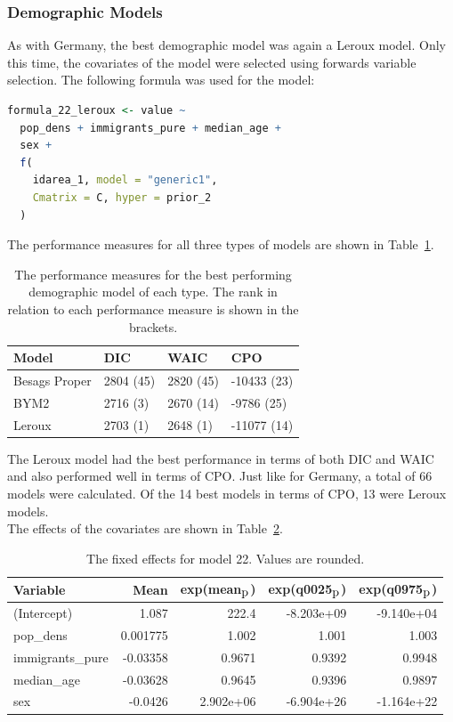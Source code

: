 \subsubsection{Demographic Models}
As with Germany, the best demographic model was again a Leroux model. Only this time, the covariates of the model were selected using forwards variable selection. The following formula was used for the model:
\begin{lstlisting}[caption={The formula for the best Leroux model based on the demographic variables}, label={codeDemoNorway}, language = R]
formula_22_leroux <- value ~
  pop_dens + immigrants_pure + median_age +
  sex +
  f(
    idarea_1, model = "generic1",
    Cmatrix = C, hyper = prior_2
  )
\end{lstlisting}
The performance measures for all three types of models are shown in Table~\ref{demoNorway}.
\begin{table}[H] 
\caption{The performance measures for the best performing demographic model of each type. The rank in relation to each performance measure is shown in the brackets. \label{demoNorway}}
\begin{tabular}{l l l l}
\toprule
\textbf{Model}	& \textbf{DIC}	& \textbf{WAIC} & \textbf{CPO} \\
\midrule
Besags Proper  & 2804 (45) & 2820 (45) & -10433 (23) \\
BYM2 & 2716 (3) & 2670 (14) & -9786 (25)\\
Leroux & 2703 (1) & 2648 (1) & -11077 (14) \\
\bottomrule
\end{tabular}
\end{table}
The Leroux model had the best performance in terms of both DIC and WAIC and also performed well in terms of CPO. Just like for Germany, a total of 66 models were calculated. Of the 14 best models in terms of CPO, 13 were Leroux models. \\
The effects of the covariates are shown in Table~\ref{fixedDemoNorway}.
\begin{table}[H] 
\caption{The fixed effects for model 22. Values are rounded. \label{fixedDemoNorway}}
\begin{tabular}{l r r r r}
\toprule
\textbf{Variable}	& \textbf{Mean}	& \textbf{exp(mean$_{\hbox{p}}$)} & \textbf{exp(q0025$_{\hbox{p}}$)} & \textbf{exp(q0975$_{\hbox{p}}$)} \\
\midrule
(Intercept) & 1.087 & 222.4 & -8.203e+09 & -9.140e+04\\
pop\_dens & 0.001775 & 1.002 & 1.001 & 1.003\\
immigrants\_pure & -0.03358 & 0.9671 & 0.9392 & 0.9948\\
median\_age & -0.03628  & 0.9645 & 0.9396 & 0.9897\\
sex & -0.0426 & 2.902e+06 & -6.904e+26 & -1.164e+22 \\
\bottomrule
\end{tabular}
\end{table}
